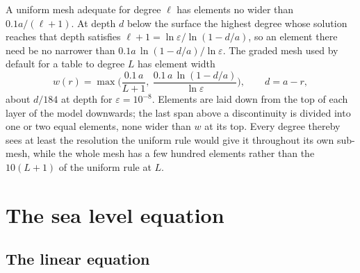 \documentclass[11pt,a4paper]{article}
\numberwithin{equation}{section}
\begin{document}
A uniform mesh adequate for degree $\ell$ has elements no wider than
$0.1a/(\ell+1)$. At depth $d$ below the surface the highest degree whose
solution reaches that depth satisfies $\ell+1 = \ln\varepsilon/\ln(1-d/a)$, so
an element there need be no narrower than $0.1a\,\ln(1-d/a)/\ln\varepsilon$.
The graded mesh used by default for a table to degree $L$ has element width
\begin{equation}
w(r) = \max\Big(\frac{0.1\,a}{L+1},\ \frac{0.1\,a\,\ln(1-d/a)}{\ln\varepsilon}\Big),
\qquad d=a-r,
\label{eq:graded}
\end{equation}
about $d/184$ at depth for $\varepsilon=10^{-8}$. Elements are laid down from the
top of each layer of the model downwards; the last span above a discontinuity
is divided into one or two equal elements, none wider than $w$ at its top.
Every degree thereby sees at least the resolution the uniform rule would give
it throughout its own sub-mesh, while the whole mesh has a few hundred elements
rather than the $10(L+1)$ of the uniform rule at $L$.

\section{The sea level equation}
\label{sec:sle}

\subsection{The linear equation}
\end{document}
